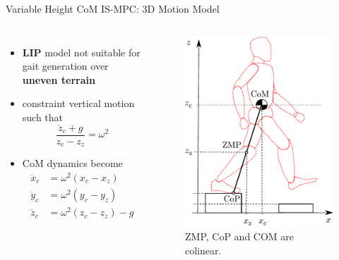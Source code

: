\documentclass[10pt]{beamer}
\begin{document}
\begin{frame}{Variable Height CoM IS-MPC: 3D Motion Model}
  \begin{columns}[c,onlytextwidth]
      \begin{itemize}
        \item \textbf{LIP} model not suitable for gait generation over
						\textbf{uneven terrain}
				\item constraint vertical motion such that
			    \begin{equation*}
            \frac{\ddot{z}_c + g}{z_c - z_z} = \omega^2
          \end{equation*}
				\item CoM dynamics become
				  \begin{align*}
					  \ddot{x}_c &= \omega^2 (x_c - x_z)\\
					  \ddot{y}_c &= \omega^2 (y_c - y_z)\\
					  \ddot{z}_c &= \omega^2 (z_c - z_z) - g
				  \end{align*}
			\end{itemize}
		  \begin{figure}
        \centering
        \includegraphics[width=\textwidth]{figures/LIPM_robot.pdf}
        \caption{ZMP, CoP and COM are colinear.}
        \label{fig:lipm-robot}
    \end{figure}
	\end{columns}
\end{frame}
\end{document}
